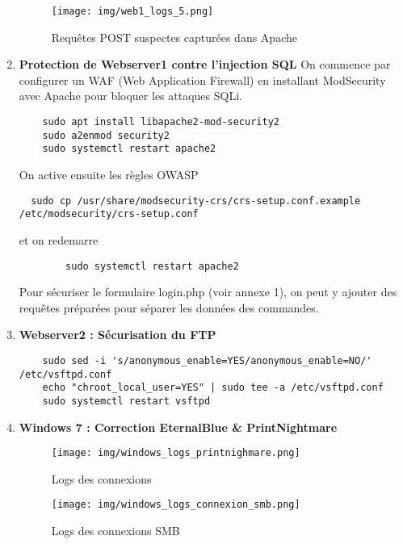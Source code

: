\documentclass[a4paper,12pt]{report}
\begin{document}
\begin{enumerate}
\begin{figure}[H]
    \centering
    \texttt{[image: img/web1\_logs\_5.png]}
    \caption{Requêtes POST suspectes capturées dans Apache}
\end{figure}

    \item \textbf{Protection de Webserver1 contre l'injection SQL}
    On commence par configurer un WAF (Web Application Firewall)
en installant ModSecurity avec Apache pour bloquer les attaques SQLi.
    \begin{lstlisting}
    sudo apt install libapache2-mod-security2
    sudo a2enmod security2
    sudo systemctl restart apache2
    \end{lstlisting}
    On active ensuite  les règles OWASP
    
\begin{lstlisting}
  sudo cp /usr/share/modsecurity-crs/crs-setup.conf.example /etc/modsecurity/crs-setup.conf
    \end{lstlisting}
    et on redemarre 
    \begin{lstlisting}
        sudo systemctl restart apache2
    \end{lstlisting}
    Pour sécuriser le formulaire login.php (voir annexe 1), on peut y ajouter des requêtes préparées pour séparer les données des commandes. 

    
    \item \textbf{Webserver2 : Sécurisation du FTP}
    \begin{lstlisting}
    sudo sed -i 's/anonymous_enable=YES/anonymous_enable=NO/' /etc/vsftpd.conf
    echo "chroot_local_user=YES" | sudo tee -a /etc/vsftpd.conf
    sudo systemctl restart vsftpd
    \end{lstlisting}

    \item \textbf{Windows 7 : Correction EternalBlue \& PrintNightmare}

    \begin{figure}[H]
    \centering
    \texttt{[image: img/windows\_logs\_printnighmare.png]}
    \caption{Logs des connexions}
\end{figure}

   \begin{figure}[H]
    \centering
    \texttt{[image: img/windows\_logs\_connexion\_smb.png]}
    \caption{Logs des connexions SMB}
\end{figure}


\end{enumerate}
\end{document}
